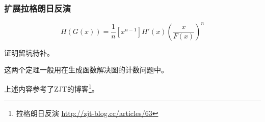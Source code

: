 \subsubsection{扩展拉格朗日反演}
\begin{theorem}
	\begin{displaymath}
		[x_n]H(G(x))=\frac{1}{n}[x^{n-1}]H'(x)(\frac{x}{F(x)})^n
	\end{displaymath}
\end{theorem}
证明留坑待补。

这两个定理一般用在生成函数解决图的计数问题中。

上述内容参考了ZJT的博客\footnote{
	拉格朗日反演
	\url{http://zjt-blog.cc/articles/63}
}。

